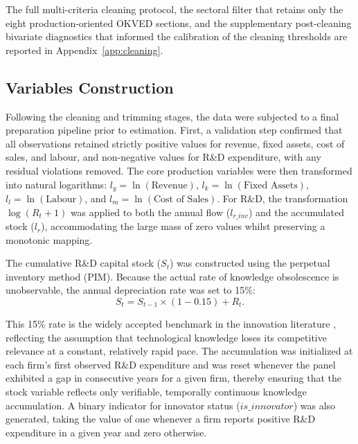 \documentclass[a4paper, 12pt]{article}
\begin{document}
The full multi-criteria cleaning protocol, the sectoral filter that retains only the eight production-oriented OKVED sections, and the supplementary post-cleaning bivariate diagnostics that informed the calibration of the cleaning thresholds are reported in Appendix~\ref{app:cleaning}.\hypertarget{target:sector_rd_shares_detailed}{}\hypertarget{target:median_log_distributions}{}\hypertarget{target:rd_investment_revenue_comparison}{}\hypertarget{target:revenue_distribution_dynamics}{}\hypertarget{target:spearman_correlation}{}\hypertarget{target:box_rd_assets_comparison}{}\hypertarget{target:dist_gross_profit}{}\hypertarget{target:dist_operating_profit}{}\hypertarget{target:revenue_by_sector_box}{}\hypertarget{target:scatter_rev_rd_assets}{}

\subsection{Variables Construction}
\label{subsec:variables_construction}

Following the cleaning and trimming stages, the data were subjected to a final preparation pipeline prior to estimation. First, a validation step confirmed that all observations retained strictly positive values for revenue, fixed assets, cost of sales, and labour, and non-negative values for R\&D expenditure, with any residual violations removed. The core production variables were then transformed into natural logarithms: $l_y = \ln(\text{Revenue})$, $l_k = \ln(\text{Fixed Assets})$, $l_l = \ln(\text{Labour})$, and $l_m = \ln(\text{Cost of Sales})$. For R\&D, the transformation $\log(R_t + 1)$ was applied to both the annual flow ($l_{r\_inv}$) and the accumulated stock ($l_r$), accommodating the large mass of zero values whilst preserving a monotonic mapping.

The cumulative R\&D capital stock ($S_t$) was constructed using the perpetual inventory method (PIM). Because the actual rate of knowledge obsolescence is unobservable, the annual depreciation rate was set to 15\%:
\begin{equation}
    S_t = S_{t-1} \times (1 - 0.15) + R_t.
\end{equation}

This 15\% rate is the widely accepted benchmark in the innovation literature \parencite{griliches1979issues}, reflecting the assumption that technological knowledge loses its competitive relevance at a constant, relatively rapid pace. The accumulation was initialized at each firm's first observed R\&D expenditure and was reset whenever the panel exhibited a gap in consecutive years for a given firm, thereby ensuring that the stock variable reflects only verifiable, temporally continuous knowledge accumulation. A binary indicator for innovator status ($is\_innovator$) was also generated, taking the value of one whenever a firm reports positive R\&D expenditure in a given year and zero otherwise.
\end{document}
